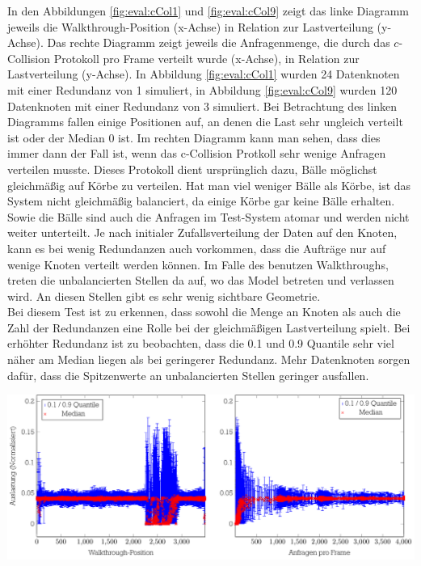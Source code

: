 In den Abbildungen \ref{fig:eval:cCol1} und \ref{fig:eval:cCol9} zeigt das linke Diagramm jeweils die Walkthrough-Position (x-Achse) in Relation zur Lastverteilung (y-Achse). Das rechte Diagramm zeigt jeweils die Anfragenmenge, die durch das $c$-Collision Protokoll pro Frame verteilt wurde (x-Achse), in Relation zur Lastverteilung (y-Achse). In Abbildung \ref{fig:eval:cCol1} wurden 24 Datenknoten mit einer Redundanz von 1 simuliert, in Abbildung \ref{fig:eval:cCol9} wurden 120 Datenknoten mit einer Redundanz von 3 simuliert. Bei Betrachtung des linken Diagramms fallen einige Positionen auf, an denen die Last sehr ungleich verteilt ist oder der Median 0 ist. Im rechten Diagramm kann man sehen, dass dies immer dann der Fall ist, wenn das c-Collision Protkoll sehr wenige Anfragen verteilen musste. Dieses Protokoll dient ursprünglich dazu, Bälle möglichst gleichmäßig auf Körbe zu verteilen. Hat man viel weniger Bälle als Körbe, ist das System nicht gleichmäßig balanciert, da einige Körbe gar keine Bälle erhalten. Sowie die Bälle sind auch die Anfragen im Test-System atomar und werden nicht weiter unterteilt. Je nach initialer Zufallsverteilung der Daten auf den Knoten, kann es bei wenig Redundanzen auch vorkommen, dass die Aufträge nur auf wenige Knoten verteilt werden können. Im Falle des benutzen Walkthroughs, treten die unbalancierten Stellen da auf, wo das Model betreten und verlassen wird. An diesen Stellen gibt es sehr wenig sichtbare Geometrie.\\
Bei diesem Test ist zu erkennen, dass sowohl die Menge an Knoten als auch die Zahl der Redundanzen eine Rolle bei der gleichmäßigen Lastverteilung spielt. Bei erhöhter Redundanz ist zu beobachten, dass die 0.1 und 0.9 Quantile sehr viel näher am Median liegen als bei geringerer Redundanz. Mehr Datenknoten sorgen dafür, dass die Spitzenwerte an unbalancierten Stellen geringer ausfallen.
\begin{Bild}
\includegraphics[scale=0.75]{images/diag_cCol_red3_render4_data120_2x.pdf}
\end{Bild}

